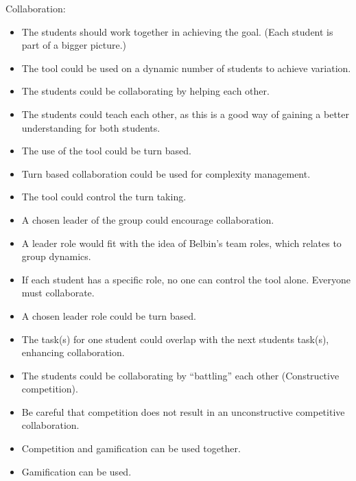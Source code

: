Collaboration:
\begin{itemize}
\item	The students should work together in achieving the goal. (Each student is part of a bigger picture.)
\item	The tool could be used on a dynamic number of students to achieve variation. 
\item	The students could be collaborating by helping each other. 
\item	The students could teach each other, as this is a good way of gaining a better understanding for both students. 
\item	The use of the tool could be turn based.
\item	Turn based collaboration could be used for complexity management.
\item	The tool could control the turn taking. 
\item	A chosen leader of the group could encourage collaboration.
\item	A leader role would fit with the idea of Belbin’s team roles, which relates to group dynamics. 
\item	If each student has a specific role, no one can control the tool alone. Everyone must collaborate. 
\item	A chosen leader role could be turn based.
\item	The task(s) for one student could overlap with the next students task(s), enhancing collaboration. 
\item	The students could be collaborating by “battling” each other (Constructive competition).
\item	Be careful that competition does not result in an unconstructive competitive collaboration. 
\item	Competition and gamification can be used together. 
\item	 Gamification can be used. 
\end{itemize}

